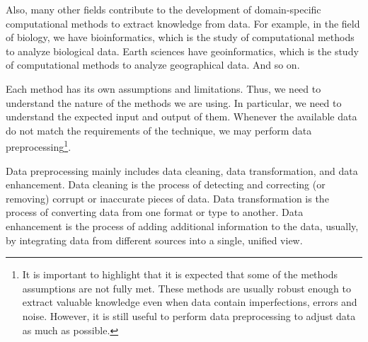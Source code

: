 Also, many other fields contribute to the development of domain-specific computational
methods to extract knowledge from data.  For example, in the field of biology, we have
bioinformatics, which is the study of computational methods to analyze biological data.
Earth sciences have geoinformatics, which is the study of computational methods to
analyze geographical data.  And so on.

Each method has its own assumptions and limitations.  Thus, we need to understand the
nature of the methods we are using.  In particular, we need to understand the
expected input and output of them.  Whenever the available data do not match the
requirements of the technique, we may perform data preprocessing\footnote{%
  It is important to highlight that it is expected that some of the methods assumptions
  are not fully met.  These methods are usually robust enough to extract valuable
  knowledge even when data contain imperfections, errors and noise.  However, it is still
  useful to perform data preprocessing to adjust data as much as possible.%
}.

Data preprocessing mainly includes data cleaning, data transformation, and data
enhancement. Data cleaning is the process of detecting and correcting (or removing)
corrupt or inaccurate pieces of data.  Data transformation is the process of converting
data from one format or type to another.  Data enhancement is the process of adding
additional information to the data, usually, by integrating
data from different sources into a single, unified view.

